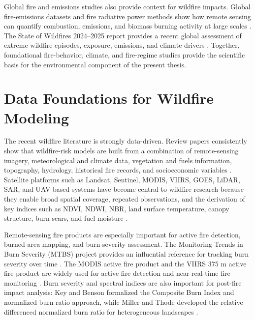 Global fire and emissions studies also provide context for wildfire impacts. Global fire-emissions datasets and fire radiative power methods show how remote sensing can quantify combustion, emissions, and biomass burning activity at large scales \citep{randerson2012gfed,van_der_werf2017global,wooster2005fire}. The State of Wildfires 2024--2025 report provides a recent global assessment of extreme wildfire episodes, exposure, emissions, and climate drivers \citep{kelley2025state}. Together, foundational fire-behavior, climate, and fire-regime studies provide the scientific basis for the environmental component of the present thesis.

\section{Data Foundations for Wildfire Modeling}

The recent wildfire literature is strongly data-driven. Review papers consistently show that wildfire-risk models are built from a combination of remote-sensing imagery, meteorological and climate data, vegetation and fuels information, topography, hydrology, historical fire records, and socioeconomic variables \citep{jain2020review,xu2025deeplearning,xu2024survey,ejaz2025mlpipeline,jodhani2026ai,liu2025advancements}. Satellite platforms such as Landsat, Sentinel, MODIS, VIIRS, GOES, LiDAR, SAR, and UAV-based systems have become central to wildfire research because they enable broad spatial coverage, repeated observations, and the derivation of key indices such as NDVI, NDWI, NBR, land surface temperature, canopy structure, burn scars, and fuel moisture \citep{jodhani2026ai,xu2025deeplearning}.

Remote-sensing fire products are especially important for active fire detection, burned-area mapping, and burn-severity assessment. The Monitoring Trends in Burn Severity (MTBS) project provides an influential reference for tracking burn severity over time \citep{eidenshink2007mtbs}. The MODIS active fire product and the VIIRS 375 m active fire product are widely used for active fire detection and near-real-time fire monitoring \citep{giglio2016modis,schroeder2014viirs}. Burn severity and spectral indices are also important for post-fire impact analysis: Key and Benson formalized the Composite Burn Index and normalized burn ratio approach, while Miller and Thode developed the relative differenced normalized burn ratio for heterogeneous landscapes \citep{key2006firemon,miller2007severity}.

